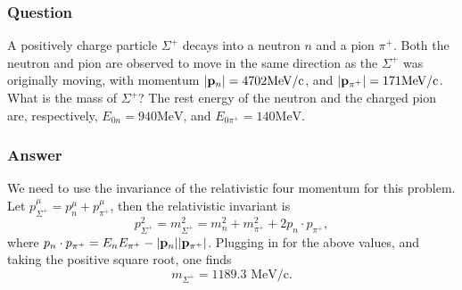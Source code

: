\subsubsection{Question}
A positively charge particle $\Sigma^+$ decays into a neutron $n$ and a pion $\pi^+$. Both the neutron and pion are observed to move in the same direction as the $\Sigma^+$ was originally moving, with momentum $\abs{\mathbf{p}_n} = 4702\text{MeV/c}$, and $\abs{\mathbf{p}_{\pi^+}}=171\text{MeV/c}$. What is the mass of $\Sigma^+$? The rest energy of the neutron and the charged pion are, respectively, $E_{0n}=940\text{MeV}$, and $E_{0\pi^+}=140\text{MeV}$.

\subsubsection{Answer}
We need to use the invariance of the relativistic four momentum for this problem. Let $p^\mu_{\Sigma^+} = p^\mu_{n} + p^\mu_{\pi^+}$, then the relativistic invariant is
\begin{equation*}
	p^2_{\Sigma^+} = m^2_{\Sigma^+} = m^2_n + m^2_{\pi^+} + 2p_{n}\cdot p_{\pi^+},
\end{equation*}
where $p_n\cdot p_{\pi^+} = E_{n} E_{\pi^+} - \abs{\mathbf{p}_n}\abs{\mathbf{p}_{\pi^+}}$. Plugging in for the above values, and taking the positive square root, one finds
\begin{equation*}
	m_{\Sigma^+} = 1189.3 \text{ MeV/c}.
\end{equation*}


